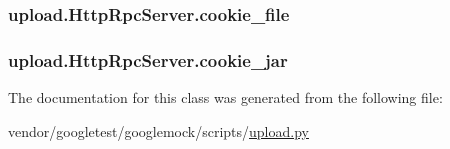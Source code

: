 \subsubsection[{\texorpdfstring{cookie\+\_\+file}{cookie_file}}]{\setlength{\rightskip}{0pt plus 5cm}upload.\+Http\+Rpc\+Server.\+cookie\+\_\+file}\hypertarget{classupload_1_1HttpRpcServer_ad5c1a730c030f9d3b5f70c2e0d8b9a1d}{}\label{classupload_1_1HttpRpcServer_ad5c1a730c030f9d3b5f70c2e0d8b9a1d}
\subsubsection[{\texorpdfstring{cookie\+\_\+jar}{cookie_jar}}]{\setlength{\rightskip}{0pt plus 5cm}upload.\+Http\+Rpc\+Server.\+cookie\+\_\+jar}\hypertarget{classupload_1_1HttpRpcServer_a1b9c9af7f0a46afd84a9d524782323bf}{}\label{classupload_1_1HttpRpcServer_a1b9c9af7f0a46afd84a9d524782323bf}


The documentation for this class was generated from the following file\+:\begin{DoxyCompactItemize}
\item 
vendor/googletest/googlemock/scripts/\hyperlink{googlemock_2scripts_2upload_8py}{upload.\+py}\end{DoxyCompactItemize}
